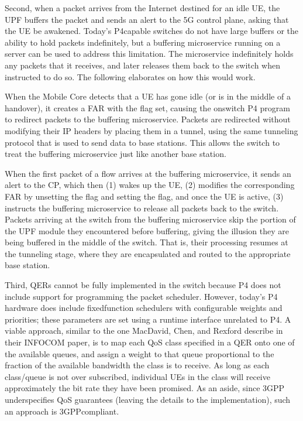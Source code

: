 \documentclass[a4paper,11pt,english]{sphinxmanual}
\begin{document}
\sphinxAtStartPar
Second, when a packet arrives from the Internet destined for an idle
UE, the UPF buffers the packet and sends an alert to the 5G control
plane, asking that the UE be awakened. Today’s P4\sphinxhyphen{}capable switches do
not have large buffers or the ability to hold packets indefinitely,
but a buffering microservice running on a server can be used to
address this limitation. The microservice indefinitely holds any
packets that it receives, and later releases them back to the switch
when instructed to do so. The following elaborates on how this would
work.

\sphinxAtStartPar
When the Mobile Core detects that a UE has gone idle (or is in the
middle of a handover), it creates a FAR with the  flag set,
causing the on\sphinxhyphen{}switch P4 program to redirect packets to the buffering
microservice. Packets are redirected without modifying their IP
headers by placing them in a tunnel, using the same tunneling protocol
that is used to send data to base stations.  This allows the switch to
treat the buffering microservice just like another base station.

\sphinxAtStartPar
When the first packet of a flow arrives at the buffering microservice,
it sends an alert to the CP, which then (1) wakes up the UE, (2)
modifies the corresponding FAR by unsetting the  flag and
setting the  flag, and once the UE is active, (3) instructs
the buffering microservice to release all packets back to the
switch. Packets arriving at the switch from the buffering microservice
skip the portion of the UPF module they encountered before buffering,
giving the illusion they are being buffered in the middle of the
switch. That is, their processing resumes at the tunneling stage,
where they are encapsulated and routed to the appropriate base
station.

\sphinxAtStartPar
Third, QERs cannot be fully implemented in the switch because P4 does
not include support for programming the packet scheduler. However,
today’s P4 hardware does include fixed\sphinxhyphen{}function schedulers with
configurable weights and priorities; these parameters are set using a
runtime interface unrelated to P4. A viable approach, similar to the
one MacDavid, Chen, and Rexford describe in their INFOCOM paper, is to
map each QoS class specified in a QER onto one of the available
queues, and assign a weight to that queue proportional to the fraction
of the available bandwidth the class is to receive. As long as each
class/queue is not over subscribed, individual UEs in the class will
receive approximately the bit rate they have been promised. As an
aside, since 3GPP under\sphinxhyphen{}specifies QoS guarantees (leaving the details
to the implementation), such an approach is 3GPP\sphinxhyphen{}compliant.
\end{document}
